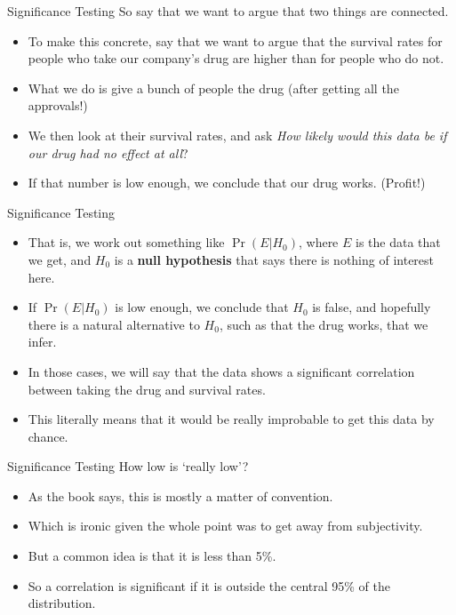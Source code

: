\documentclass[
  ignorenonframetext,
]{beamer}
\providecommand{\tightlist}{%
  \setlength{\itemsep}{0pt}\setlength{\parskip}{0pt}}
\renewcommand{\,}{\text{, }}
\begin{document}
\begin{frame}{Significance Testing}
\protect\hypertarget{significance-testing-2}{}
So say that we want to argue that two things are connected.

\begin{itemize}
\tightlist
\item
  To make this concrete, say that we want to argue that the survival
  rates for people who take our company's drug are higher than for
  people who do not.
\item
  What we do is give a bunch of people the drug (after getting all the
  approvals!)
\item
  We then look at their survival rates, and ask \emph{How likely would
  this data be if our drug had no effect at all}?
\item
  If that number is low enough, we conclude that our drug works.
  (Profit!)
\end{itemize}
\end{frame}

\begin{frame}{Significance Testing}
\protect\hypertarget{significance-testing-3}{}
\begin{itemize}
\tightlist
\item
  That is, we work out something like \(\Pr(E | H_0)\), where \(E\) is
  the data that we get, and \(H_0\) is a \textbf{null hypothesis} that
  says there is nothing of interest here.
\item
  If \(\Pr(E | H_0)\) is low enough, we conclude that \(H_0\) is false,
  and hopefully there is a natural alternative to \(H_0\), such as that
  the drug works, that we infer.
\item
  In those cases, we will say that the data shows a significant
  correlation between taking the drug and survival rates.
\item
  This literally means that it would be really improbable to get this
  data by chance.
\end{itemize}
\end{frame}

\begin{frame}{Significance Testing}
\protect\hypertarget{significance-testing-4}{}
How low is `really low'?

\begin{itemize}
\tightlist
\item
  As the book says, this is mostly a matter of convention.
\item
  Which is ironic given the whole point was to get away from
  subjectivity.
\item
  But a common idea is that it is less than 5\%.
\item
  So a correlation is significant if it is outside the central 95\% of
  the distribution.
\end{itemize}
\end{frame}
\end{document}
